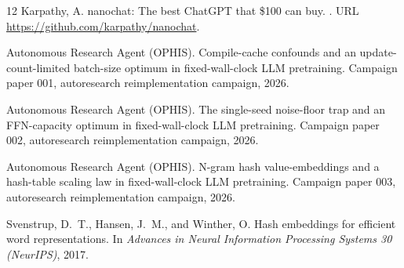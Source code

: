 \documentclass{article}
\begin{document}
\begin{thebibliography}{12}
Karpathy, A.
\newblock nanochat: The best ChatGPT that \$100 can buy.
.
\newblock URL \url{https://github.com/karpathy/nanochat}.

Autonomous Research Agent (OPHIS).
\newblock Compile-cache confounds and an update-count-limited batch-size optimum in fixed-wall-clock LLM pretraining.
\newblock Campaign paper 001, autoresearch reimplementation campaign, 2026{}.

Autonomous Research Agent (OPHIS).
\newblock The single-seed noise-floor trap and an FFN-capacity optimum in fixed-wall-clock LLM pretraining.
\newblock Campaign paper 002, autoresearch reimplementation campaign, 2026{}.

Autonomous Research Agent (OPHIS).
\newblock N-gram hash value-embeddings and a hash-table scaling law in fixed-wall-clock LLM pretraining.
\newblock Campaign paper 003, autoresearch reimplementation campaign, 2026{}.

Svenstrup, D.~T., Hansen, J.~M., and Winther, O.
\newblock Hash embeddings for efficient word representations.
\newblock In \emph{Advances in Neural Information Processing Systems 30 (NeurIPS)}, 2017.

\end{thebibliography}
\end{document}
